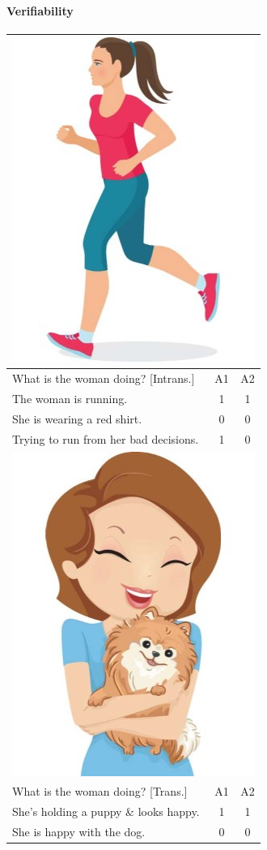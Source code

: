 \documentclass[11pt,a4paper]{article}
\begin{document}
\paragraph{Verifiability}

\begin{table}[t!]
\begin{center}
\begin{tabular}{|l|c|c|}
\hline
\multicolumn{3}{|c|}{\includegraphics[width=0.35\columnwidth]{figures/I30.jpg}} \\
\hline
What is the woman doing? [Intrans.] & A1 & A2 \\
\hline
The woman is running. & 1 & 1 \\
\hline
She is wearing a red shirt. & 0 & 0 \\
\hline
Trying to run from her bad decisions. & 1 & 0 \\
\hline
\hline
\multicolumn{3}{|c|}{\includegraphics[width=0.35\columnwidth]{figures/I29.jpg}} \\
\hline
What is the woman doing? [Trans.] & A1 & A2 \\
\hline
She's holding a puppy \& looks happy. & 1 & 1 \\
\hline
She is happy with the dog. & 0 & 0 \\

\end{tabular}
\end{center}
\end{table}
\end{document}
